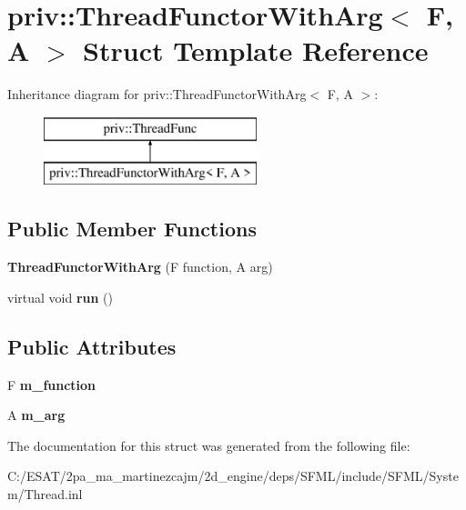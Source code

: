 \hypertarget{structpriv_1_1_thread_functor_with_arg}{}\section{priv\+:\+:Thread\+Functor\+With\+Arg$<$ F, A $>$ Struct Template Reference}
\label{structpriv_1_1_thread_functor_with_arg}
Inheritance diagram for priv\+:\+:Thread\+Functor\+With\+Arg$<$ F, A $>$\+:\begin{figure}[H]
\begin{center}
\leavevmode
\includegraphics[height=2.000000cm]{structpriv_1_1_thread_functor_with_arg}
\end{center}
\end{figure}
\subsection*{Public Member Functions}
\begin{DoxyCompactItemize}
\item 
\mbox{\label{structpriv_1_1_thread_functor_with_arg_ae3745753b77880cdfda6f10d72748efa}} 
{\bfseries Thread\+Functor\+With\+Arg} (F function, A arg)
\item 
\mbox{\label{structpriv_1_1_thread_functor_with_arg_a0f8bb6ba36819e80016528bab8b0bd4f}} 
virtual void {\bfseries run} ()
\end{DoxyCompactItemize}
\subsection*{Public Attributes}
\begin{DoxyCompactItemize}
\item 
\mbox{\label{structpriv_1_1_thread_functor_with_arg_ab12992af3112f15df4b6f0dbce3137b9}} 
F {\bfseries m\+\_\+function}
\item 
\mbox{\label{structpriv_1_1_thread_functor_with_arg_ac598f7701f976320bc3964733b9ae9ae}} 
A {\bfseries m\+\_\+arg}
\end{DoxyCompactItemize}


The documentation for this struct was generated from the following file\+:\begin{DoxyCompactItemize}
\item 
C\+:/\+E\+S\+A\+T/2pa\+\_\+ma\+\_\+martinezcajm/2d\+\_\+engine/deps/\+S\+F\+M\+L/include/\+S\+F\+M\+L/\+System/Thread.\+inl\end{DoxyCompactItemize}
